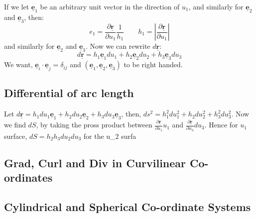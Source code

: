 \documentclass{article}
\renewcommand{\vec}[1]{\underline{\textbf{#1}}}
\newcommand{\pd}[2]{\frac{\partial #1}{\partial #2}}
\begin{document}
If we let $\vec e_1$ be an arbitrary unit vector in the direction of $u_1$, and similarly for $\vec e_2$ and $\vec e_3$, then:
$$ e_1 = \pd{\vec r}{u_1}\frac{1}{h_1} \qquad h_1 = \left|\pd{\vec r}{u_1} \right| $$
and similarly for $\vec e_2$ and $\vec e_3$. Now we can rewrite $d\vec r$:
$$ d\vec r = h_1\vec e_1 du_1 + h_2\vec e_2 du_2 + h_3\vec e_3 du_3 $$
We want, $\vec e_i \cdot \vec e_j = \delta_{ij}$ and $(\vec e_1, \vec e_2, \vec e_3)$ to be right handed.

\subsection{Differential of arc length}
Let $\displaystyle{d\vec r} = h_1du_1\vec e_1 + h_2du_2\vec e_2 + h_3du_3\vec e_3$, then, $\displaystyle{ds^2 = h_1^2du_1^2 + h_2du_2^2 + h_3^2du_3^2}$. Now we find $dS$, by taking the pross product between $\displaystyle{\pd{\vec r}{u_1}u_1}$ and $\displaystyle{\pd{\vec r}{u_3}du_3}$. Hence for $u_1$ surface,
$dS = h_2h_3du_2du_3$
for the u_2 surfa


\subsection{Grad, Curl and Div in Curvilinear Co-ordinates}


\subsection{Cylindrical and Spherical Co-ordinate Systems}
\end{document}

